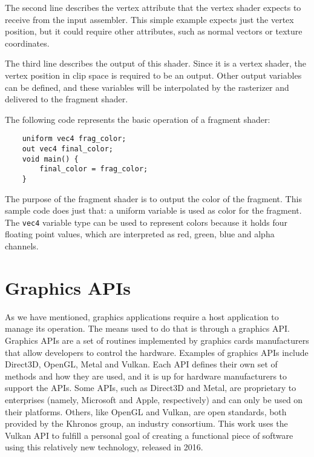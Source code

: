 The second line describes the vertex attribute that the vertex shader expects to receive from the input assembler. This simple example expects just the vertex position, but it could require other attributes, such as normal vectors or texture coordinates.

The third line describes the output of this shader. Since it is a vertex shader, the vertex position in clip space is required to be an output. Other output variables can be defined, and these variables will be interpolated by the rasterizer and delivered to the fragment shader.

The following code represents the basic operation of a fragment shader:

\begin{verbatim}
    uniform vec4 frag_color;
    out vec4 final_color;
    void main() {
        final_color = frag_color;
    }
\end{verbatim}

The purpose of the fragment shader is to output the color of the fragment. This sample code does just that: a uniform variable is used as color for the fragment. The \texttt{vec4} variable type can be used to represent colors because it holds four floating point values, which are interpreted as red, green, blue and alpha channels.

\section{Graphics APIs}
As we have mentioned, graphics applications require a host application to manage its operation. The means used to do that is through a graphics API. Graphics APIs are a set of routines implemented by graphics cards manufacturers that allow developers to control the hardware. Examples of graphics APIs include Direct3D, OpenGL, Metal and Vulkan. Each API defines their own set of methods and how they are used, and it is up for hardware manufacturers to support the APIs. Some APIs, such as Direct3D and Metal, are proprietary to enterprises (namely, Microsoft and Apple, respectively) and can only be used on their platforms. Others, like OpenGL and Vulkan, are open standards, both provided by the Khronos group, an industry consortium. This work uses the Vulkan API to fulfill a personal goal of creating a functional piece of software using this relatively new technology, released in 2016.



%
%
